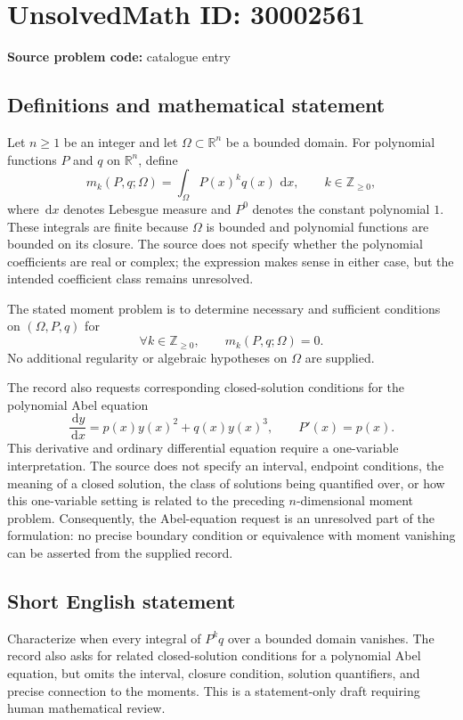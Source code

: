 \documentclass[11pt]{article}
\newcommand{\Z}{\mathbb{Z}}
\newcommand{\R}{\mathbb{R}}
\newcommand{\dd}{\,\mathrm{d}}
\begin{document}
\section*{UnsolvedMath ID: 30002561}
\textbf{Source problem code:} catalogue entry
\subsection{Definitions and mathematical statement}
Let \(n\geq 1\) be an integer and let \(\Omega\subset\R^n\) be a bounded domain. For polynomial functions \(P\) and \(q\) on \(\R^n\), define
\[
 m_k(P,q;\Omega)=\int_{\Omega}P(x)^kq(x)\,\dd x,
 \qquad k\in\Z_{\geq 0},
\]
where \(\dd x\) denotes Lebesgue measure and \(P^0\) denotes the constant polynomial \(1\). These integrals are finite because \(\Omega\) is bounded and polynomial functions are bounded on its closure. The source does not specify whether the polynomial coefficients are real or complex; the expression makes sense in either case, but the intended coefficient class remains unresolved.

The stated moment problem is to determine necessary and sufficient conditions on \((\Omega,P,q)\) for
\[
 \forall k\in\Z_{\geq 0},\qquad m_k(P,q;\Omega)=0.
\]
No additional regularity or algebraic hypotheses on \(\Omega\) are supplied.

The record also requests corresponding closed-solution conditions for the polynomial Abel equation
\[
 \frac{\dd y}{\dd x}=p(x)y(x)^2+q(x)y(x)^3,
 \qquad P'(x)=p(x).
\]
This derivative and ordinary differential equation require a one-variable interpretation. The source does not specify an interval, endpoint conditions, the meaning of a closed solution, the class of solutions being quantified over, or how this one-variable setting is related to the preceding \(n\)-dimensional moment problem. Consequently, the Abel-equation request is an unresolved part of the formulation: no precise boundary condition or equivalence with moment vanishing can be asserted from the supplied record.
\subsection{Short English statement}
Characterize when every integral of \(P^kq\) over a bounded domain vanishes. The record also asks for related closed-solution conditions for a polynomial Abel equation, but omits the interval, closure condition, solution quantifiers, and precise connection to the moments. This is a statement-only draft requiring human mathematical review.
\end{document}
